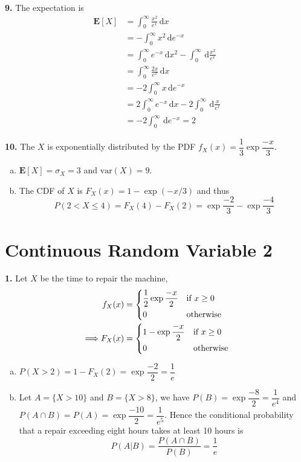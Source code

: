 \documentclass[a4paper,12pt]{article}
\newcommand{\E}{\mathbf E}
\newcommand{\ud}{\,\mathrm{d}}
\newcommand{\var}{\mathrm{var}}
\newcommand{\exercise}[1]{\noindent\textbf{#1.}}
\begin{document}
\exercise 9  The expectation is
\begin{align*}
  \E[X] &= \int_0^\infty\frac{x^2}{e^x}\ud x\\
  &= -\int_0^\infty x^2\ud e^{-x}\\
  &= \int_0^\infty e^{-x}\ud x^2 - \int_0^\infty\ud\frac{x^2}{e^x}\\
  &= \int_0^\infty\frac{2x}{e^x}\ud x\\
  &= -2\int_0^\infty x\ud e^{-x}\\
  &= 2\int_0^\infty e^{-x}\ud x - 2\int_0^\infty\ud\frac{x}{e^x}\\
  &= -2\int_0^\infty\ud e^{-x} = 2
\end{align*}

\exercise{10} The $X$ is exponentially distributed by the PDF
$f_X(x) = \dfrac{1}{3}\exp\dfrac{-x}{3}$.
\begin{enumerate}[(a)]
  \item $\E[X] = \sigma_X = 3$ and $\var(X) = 9$.
  \item The CDF of $X$ is $F_X(x) = 1 - \exp(-x/3)$ and thus
    \[P(2 < X \le 4) = F_X(4) - F_X(2) 
    = \exp\frac{-2}{3} - \exp\frac{-4}{3}\]
\end{enumerate}
\pagebreak

\section{Continuous Random Variable 2}
\exercise 1  Let $X$ be the time to repair the machine,
\begin{align*}
  f_X(x) &= \begin{dcases}
    \frac{1}{2}\exp\frac{-x}{2} &\text{if }x \ge 0\\
    0 &\text{otherwise}
  \end{dcases}\\
  \Longrightarrow F_X(x) &= \begin{dcases}
    1 - \exp\frac{-x}{2} &\text{if }x \ge 0\\
    0 &\text{otherwise}
  \end{dcases}
\end{align*}
\begin{enumerate}[(a)]
  \item $P(X > 2) = 1 - F_X(2) = \exp\dfrac{-2}{2} = \dfrac{1}{e}$
  \item Let $A = \{X > 10\}$ and $B = \{X > 8\}$, we have
    $P(B) = \exp\dfrac{-8}{2} = \dfrac{1}{e^4}$ and
    $P(A\cap B) = P(A) = \exp\dfrac{-10}{2} = \dfrac{1}{e^5}$.
    Hence the conditional probability that a repair exceeding eight hours
    takes at least 10 hours is
    \[P(A|B) = \frac{P(A\cap B)}{P(B)} = \frac{1}{e}\]
\end{enumerate}
\end{document}
